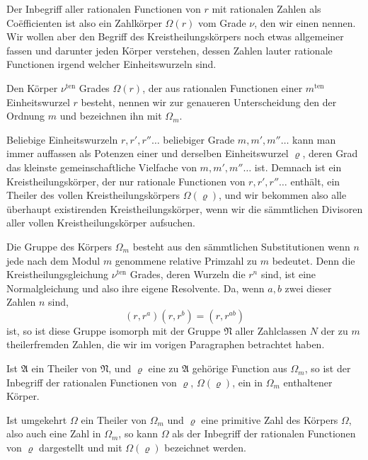 Der Inbegriff aller rationalen Functionen von $r$ mit rationalen Zahlen als Co\"efficienten ist also ein Zahlkörper $\Omega(r)$ vom Grade $\nu$, den wir einen  nennen. Wir wollen aber den Begriff des Kreistheilungskörpers noch etwas allgemeiner fassen und darunter jeden Körper verstehen, dessen Zahlen lauter rationale Functionen irgend welcher Einheitswurzeln sind.

Den Körper $\nu^{\text{ten}}$ Grades $\Omega(r)$, der aus  rationalen Functionen einer $m^{\text{ten}}$ Einheitswurzel $r$ besteht, nennen wir zur genaueren Unterscheidung den  der Ordnung $m$ und bezeichnen ihn mit $\Omega_m$.

Beliebige Einheitswurzeln $r, r', r'' \ldots$ beliebiger Grade $m, m', m'' \ldots$ kann man immer auffassen als Potenzen einer und derselben Einheitswurzel $\varrho$, deren Grad das kleinste gemeinschaftliche Vielfache von $m, m', m'' \ldots$ ist. Demnach ist ein Kreistheilungskörper, der nur rationale Functionen von $r, r', r'' \ldots$ enthält, ein Theiler des vollen Kreistheilungskörpers $\Omega(\varrho)$, und wir bekommen also alle überhaupt existirenden Kreistheilungskörper, wenn wir die sämmtlichen Divisoren aller vollen Kreistheilungskörper aufsuchen.

Die  Gruppe des Körpers $\Omega_m$ besteht aus den sämmtlichen Substitutionen
wenn $n$ jede nach dem Modul $m$ genommene relative Primzahl zu $m$ bedeutet. Denn die Kreistheilungsgleichung $\nu^{\text{ten}}$ Grades, deren Wurzeln die $r^n$ sind, ist eine Normalgleichung und also ihre eigene  Resolvente. Da, wenn $a, b$ zwei dieser Zahlen $n$ sind,
\[
(r, r^a)(r, r^b) = (r, r^{ab})
\]
ist, so ist diese Gruppe isomorph mit der Gruppe $\mathfrak{N}$ aller Zahlclassen $N$ der zu $m$ theilerfremden Zahlen, die wir im vorigen Paragraphen betrachtet haben.

Ist $\mathfrak{A}$ ein Theiler von $\mathfrak{N}$, und $\varrho$ eine zu $\mathfrak{A}$ gehörige Function aus $\Omega_m$, so ist der Inbegriff der rationalen Functionen von $\varrho$, $\Omega(\varrho)$, ein in $\Omega_m$ enthaltener Körper.

Ist umgekehrt $\Omega$ ein Theiler von $\Omega_m$ und $\varrho$ eine primitive Zahl des Körpers $\Omega$, also auch eine Zahl in $\Omega_m$, so kann $\Omega$ als der Inbegriff der rationalen Functionen von $\varrho$ dargestellt und mit $\Omega(\varrho)$ bezeichnet werden.
